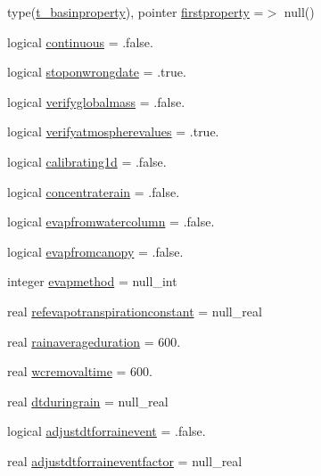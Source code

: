 \begin{DoxyCompactItemize}
type(\mbox{\hyperlink{structmodulebasin_1_1t__basinproperty}{t\+\_\+basinproperty}}), pointer \mbox{\hyperlink{structmodulebasin_1_1t__basin_a404bbde5a08888ebc184c3493d621c9a}{firstproperty}} =$>$ null()
\item 
logical \mbox{\hyperlink{structmodulebasin_1_1t__basin_a99d032145620d295e3d908dd8890bf62}{continuous}} = .false.
\item 
logical \mbox{\hyperlink{structmodulebasin_1_1t__basin_ab96a6f72dfafb8e21433d4c65f095c91}{stoponwrongdate}} = .true.
\item 
logical \mbox{\hyperlink{structmodulebasin_1_1t__basin_a4243562ac53475e489ff23c0bb47ff91}{verifyglobalmass}} = .false.
\item 
logical \mbox{\hyperlink{structmodulebasin_1_1t__basin_a4792f47b62ffb0e7f2207811dfbcba21}{verifyatmospherevalues}} = .true.
\item 
logical \mbox{\hyperlink{structmodulebasin_1_1t__basin_a319998df098c6ae444537cd1b82e073b}{calibrating1d}} = .false.
\item 
logical \mbox{\hyperlink{structmodulebasin_1_1t__basin_ab5d1d2c36727a7db80fb7edbcf810fd9}{concentraterain}} = .false.
\item 
logical \mbox{\hyperlink{structmodulebasin_1_1t__basin_a9ba0bee0222ad2c0458ec051f774ed0d}{evapfromwatercolumn}} = .false.
\item 
logical \mbox{\hyperlink{structmodulebasin_1_1t__basin_a8ed349547e5a726a572aa4525b374d6c}{evapfromcanopy}} = .false.
\item 
integer \mbox{\hyperlink{structmodulebasin_1_1t__basin_a2305c7d671de88be01b12008a2463708}{evapmethod}} = null\+\_\+int
\item 
real \mbox{\hyperlink{structmodulebasin_1_1t__basin_ac8d1c1700d1686cac8dfd8545891db7e}{refevapotranspirationconstant}} = null\+\_\+real
\item 
real \mbox{\hyperlink{structmodulebasin_1_1t__basin_a4d96cb191fd2bfc81dc464b8ea5c4ee2}{rainaverageduration}} = 600.
\item 
real \mbox{\hyperlink{structmodulebasin_1_1t__basin_a3e215249267cf3921366c2fb37d8e42a}{wcremovaltime}} = 600.
\item 
real \mbox{\hyperlink{structmodulebasin_1_1t__basin_a29f3c557c1b7c8d31dd9a3660e435af4}{dtduringrain}} = null\+\_\+real
\item 
logical \mbox{\hyperlink{structmodulebasin_1_1t__basin_a849be999bbaabd03070de3e029b5c2db}{adjustdtforrainevent}} = .false.
\item 
real \mbox{\hyperlink{structmodulebasin_1_1t__basin_ae2e9bd236e278ff4bba11a407c34d562}{adjustdtforraineventfactor}} = null\+\_\+real

\end{DoxyCompactItemize}
